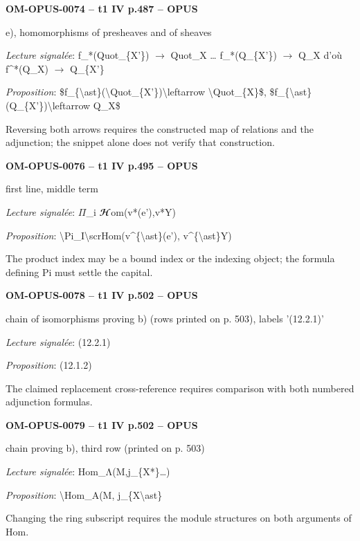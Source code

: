 \par\noindent\textbf{OM-OPUS-0074 -- t1 IV p.487 -- OPUS}\par
e), homomorphisms of presheaves and of sheaves\par
\emph{Lecture signalée}: f\_*(Quot\_\{X'\}) \ensuremath{\longrightarrow} Quot\_X … f\_*(Q\_\{X'\}) \ensuremath{\longrightarrow} Q\_X d'où f\textasciicircum{}*(Q\_X) \ensuremath{\longrightarrow} Q\_\{X'\}\par
\emph{Proposition}: \$f\_\{\textbackslash{}ast\}(\textbackslash{}Quot\_\{X'\})\textbackslash{}leftarrow \textbackslash{}Quot\_\{X\}\$, \$f\_\{\textbackslash{}ast\}(Q\_\{X'\})\textbackslash{}leftarrow Q\_X\$\par
Reversing both arrows requires the constructed map of relations and the adjunction; the snippet alone does not verify that construction.\par
\par\noindent\textbf{OM-OPUS-0076 -- t1 IV p.495 -- OPUS}\par
first line, middle term\par
\emph{Lecture signalée}: \ensuremath{\Pi}\_i \ensuremath{𝓗}om(v*(e'),v*Y)\par
\emph{Proposition}: \textbackslash{}Pi\_I\textbackslash{}scrHom(v\textasciicircum{}\{\textbackslash{}ast\}(e'), v\textasciicircum{}\{\textbackslash{}ast\}Y)\par
The product index may be a bound index or the indexing object; the formula defining Pi must settle the capital.\par
\par\noindent\textbf{OM-OPUS-0078 -- t1 IV p.502 -- OPUS}\par
chain of isomorphisms proving b) (rows printed on p. 503), labels '(12.2.1)'\par
\emph{Lecture signalée}: (12.2.1)\par
\emph{Proposition}: (12.1.2)\par
The claimed replacement cross-reference requires comparison with both numbered adjunction formulas.\par
\par\noindent\textbf{OM-OPUS-0079 -- t1 IV p.502 -- OPUS}\par
chain proving b), third row (printed on p. 503)\par
\emph{Lecture signalée}: Hom\_Λ(M,j\_\{X*\}…)\par
\emph{Proposition}: \textbackslash{}Hom\_A(M, j\_\{X\textbackslash{}ast\}\par
Changing the ring subscript requires the module structures on both arguments of Hom.\par
